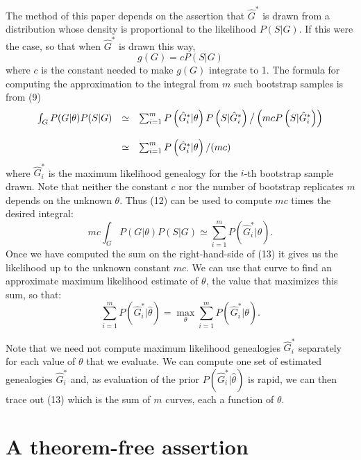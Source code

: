 The method of this paper depends on the assertion that ${\hat G}^*$ is
drawn from a distribution whose density is proportional to the likelihood
$P(S|G)$.  If this were the case, so that when ${\hat G}^*$ is drawn this way,
\begin{equation} %
g(G)  =  c P(S|G)
\end{equation}
where $c$ is the constant needed to make $g(G)$ integrate to 1.
The formula for computing the approximation to the integral from $m$ such bootstrap samples is
from (9)
\begin{equation} %
\begin{array}{c c l}
\int_G P(G|\theta) P(S|G) & \simeq & \sum_{i=1}^m P\left({\hat G}_i^*|\theta\right) P\left(S|{\hat G}_i^*\right) \big/ \left(m c P\left(S|{\hat G}_i^*\right)\right)\\
 & & \\
                          & \simeq & \sum_{i=1}^m P\left({\hat G}_i^*|\theta\right) / (m c)
\end{array}
\end{equation}
where ${\hat G}_i^*$ is the maximum likelihood genealogy for the $i$-th
bootstrap sample drawn.  Note that neither the constant $c$ nor the number
of bootstrap replicates $m$ depends on the unknown $\theta$.  Thus (12) can
be used to compute $m c$ times the desired integral:
\begin{equation} %
m c \int_G P(G|\theta) P(S|G)  \simeq  \sum_{i=1}^m P({\hat G}_i^*|\theta).
\end{equation}
Once we have computed the sum on the right-hand-side of (13) it gives us the
likelihood up to the unknown constant $m c$.  We can use that curve to find
an approximate maximum likelihood estimate of $\theta$, the value that
maximizes this sum, so that:
\begin{equation} %
\sum_{i=1}^m P\left({\hat G}_i^*|{\hat \theta}\right) =  \max_\theta \sum_{i=1}^m P\left({\hat G}_i^*|\theta\right).
\end{equation}

Note that we need not compute maximum likelihood genealogies ${\hat G}_i^*$
separately for each value of $\theta$ that we evaluate.  We can compute one
set of estimated genealogies ${\hat G}_i^*$ and, as evaluation of the prior
$P({\hat G}_i^*|{\hat \theta})$ is rapid, we can then trace out (13) which is
the sum of $m$ curves, each a function of $\theta$.

\bigskip

\section{A theorem-free assertion}

